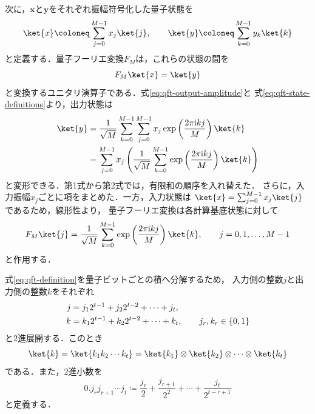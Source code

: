 次に，$\bm{x}$と$\bm{y}$をそれぞれ振幅符号化した量子状態を
\begin{equation}
  \ket{x}
  \coloneq
  \sum_{j=0}^{M-1}x_j\ket{j},
  \qquad
  \ket{y}
  \coloneq
  \sum_{k=0}^{M-1}y_k\ket{k}
  \label{eq:qft-state-definitions}
\end{equation}
と定義する．量子フーリエ変換$F_M$は，これらの状態の間を
\begin{equation}
  F_M\ket{x}
  =
  \ket{y}
  \label{eq:qft-state-transformation}
\end{equation}
と変換するユニタリ演算子である．式\eqref{eq:qft-output-amplitude}と
式\eqref{eq:qft-state-definitions}より，出力状態は
\begin{align}
  \ket{y}
  &=
  \frac{1}{\sqrt{M}}
  \sum_{k=0}^{M-1}
  \sum_{j=0}^{M-1}
  x_j
  \exp\left(
    \frac{2\pi\mathrm{i}kj}{M}
  \right)
  \ket{k}
  \notag\\
  &=
  \sum_{j=0}^{M-1}
  x_j
  \left(
    \frac{1}{\sqrt{M}}
    \sum_{k=0}^{M-1}
    \exp\left(
      \frac{2\pi\mathrm{i}kj}{M}
    \right)
    \ket{k}
  \right)
  \label{eq:qft-output-state-expansion}
\end{align}
と変形できる．第1式から第2式では，有限和の順序を入れ替えた．
さらに，入力振幅$x_j$ごとに項をまとめた．一方，入力状態は
$\ket{x}=\sum_{j=0}^{M-1}x_j\ket{j}$であるため，線形性より，
量子フーリエ変換は各計算基底状態に対して
\begin{equation}
  F_M\ket{j}
  =
  \frac{1}{\sqrt{M}}
  \sum_{k=0}^{M-1}
  \exp\left(
    \frac{2\pi\mathrm{i}kj}{M}
  \right)
  \ket{k},
  \qquad
  j=0,1,\ldots,M-1
  \label{eq:qft-definition}
\end{equation}
と作用する．

式\eqref{eq:qft-definition}を量子ビットごとの積へ分解するため，
入力側の整数$j$と出力側の整数$k$をそれぞれ
\begin{align}
  j
  &=
  j_1 2^{t-1}+j_2 2^{t-2}+\cdots+j_t,
  \notag\\
  k
  &=
  k_1 2^{t-1}+k_2 2^{t-2}+\cdots+k_t,
  \qquad
  j_r,k_r\in\{0,1\}
  \label{eq:qft-binary-integer-definitions}
\end{align}
と2進展開する．このとき
\begin{equation}
  \ket{k}
  =
  \ket{k_1k_2\cdots k_t}
  =
  \ket{k_1}\otimes\ket{k_2}\otimes\cdots\otimes\ket{k_t}
  \label{eq:qft-computational-basis-product}
\end{equation}
である．また，2進小数を
\begin{equation}
  0.j_rj_{r+1}\cdots j_t
  \coloneq
  \frac{j_r}{2}
  +\frac{j_{r+1}}{2^2}
  +\cdots
  +\frac{j_t}{2^{t-r+1}}
  \label{eq:qft-binary-fraction-definition}
\end{equation}
と定義する．

